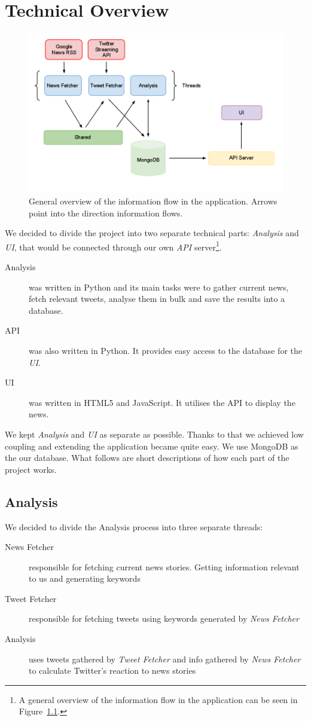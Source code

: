 \documentclass{report}
\begin{document}
	\chapter{Technical Overview}
	\begin{figure}
	 \includegraphics[scale=0.4]{infrastructure.png}
	 \caption{\label{fig:inf_flow} General overview of the information flow in the application. Arrows point into the direction information flows.}
	\end{figure}
	We decided to divide the project into two separate technical parts: \emph{Analysis} and \emph{UI}, that would be connected through our own \emph{API} server\footnote{A general overview of the information flow in the application can be seen in Figure~\ref{fig:inf_flow}.}.
	\begin{description}
	 \item[Analysis] was written in Python and its main tasks were to gather current news, fetch relevant tweets, analyse them in bulk and save the results into a database.
	 \item[API] was also written in Python. It provides easy access to the database for the \emph{UI}.
	 \item[UI] was written in HTML5 and JavaScript. It utilises the API to display the news.
	\end{description}	
	We kept \emph{Analysis} and \emph{UI} as separate as possible. Thanks to that we achieved low coupling and extending the application became quite easy. We use MongoDB as the our database. What follows are short descriptions of how each part of the project works.
	
	\section{Analysis}
	We decided to divide the Analysis process into three separate threads:
	\begin{description}
	 \item[News Fetcher] responsible for fetching current news stories. Getting information relevant to us and generating keywords
	 \item[Tweet Fetcher] responsible for fetching tweets using keywords generated by \emph{News Fetcher}
	 \item[Analysis] uses tweets gathered by \emph{Tweet Fetcher} and info gathered by \emph{News Fetcher} to calculate Twitter's reaction to news stories
	\end{description}
	
\end{document}
